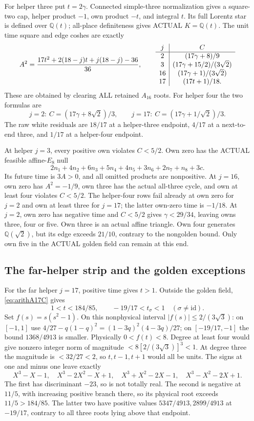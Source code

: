 For helper three put \(t=2\gamma\).
Connected simple-three normalization gives a square-two cap,
helper product \(-1\), own product \(-t\), and integral \(t\).
Its full Lorentz star is defined over \(\mathbb Q(t)\);
all-place definiteness gives ACTUAL \(K=\mathbb Q(t)\).
The unit time square and edge coshes are exactly
\[
 A^2={17t^2+2(18-j)t+j(18-j)-36\over36},
\qquad
\begin{array}{c|c}
j&C\\ \hline
2&(17\gamma+8)/9\\
3&(17\gamma+15/2)/(3\sqrt2)\\
16&(17\gamma+1)/(3\sqrt2)\\
17&(17t+1)/18 .
\end{array}
\]
These are obtained by clearing ALL retained \(A_{16}\) roots.
For helper four the two formulas are
\[
 j=2:\ C=(17\gamma+8\sqrt2)/3,\qquad
 j=17:\ C=(17\gamma+1/\sqrt2)/3 .
\]
The raw white residuals are \(18/17\) at a helper-three
endpoint, \(4/17\) at a next-to-end three, and \(1/17\)
at a helper-four endpoint.

At helper \(j=3\), every positive own violates \(C<5/2\).
Own zero has the ACTUAL feasible affine-\(E_8\) null
\[
 2n_1+4n_2+6n_3+5n_4+4n_5+3n_6+2n_7+n_8+3c .
\]
Its future time is \(3A>0\), and all omitted products are
nonpositive.
At \(j=16\), own zero has \(A^2=-1/9\), own three has
the actual all-three cycle, and own at least four violates
\(C<5/2\).
The helper-four rows fail already at own zero for \(j=2\)
and own at least three for \(j=17\); the latter own-zero
time is \(-1/18\).
At \(j=2\), own zero has negative time and
\(C<5/2\) gives \(\gamma<29/34\), leaving owns three,
four or five.
Own three is an actual affine triangle.
Own four generates \(\mathbb Q(\sqrt2)\), but its edge exceeds
\(21/10\), contrary to the nongolden bound.
Only own five in the ACTUAL golden field can remain at this end.

\subsection{The far-helper strip and the golden exceptions}
\label{app:arithA17goldenends}

For the far helper \(j=17\), positive time gives \(t>1\).
Outside the golden field, \eqref{eq:arithA17C} gives
\[
 1<t<184/85,\qquad -19/17<t_\sigma<1\quad(\sigma\ne\mathrm{id}).
\]
Set \(f(s)=s(s^2-1)\).
On this nonphysical interval
\(\lvert f(s)\rvert\le2/(3\sqrt3)\):
on \([-1,1]\) use
\(4/27-q(1-q)^2=(1-3q)^2(4-3q)/27\);
on \([-19/17,-1]\) the bound \(1368/4913\) is smaller.
Physically \(0<f(t)<8\).
Degree at least four would give nonzero integer norm of
magnitude \(<8[2/(3\sqrt3)]^3<1\).
At degree three the magnitude is \(<32/27<2\), so
\(t,t-1,t+1\) would all be units.
The signs at one and minus one leave exactly
\[
 X^3-X-1,\quad X^3-2X^2-X+1,\quad
 X^3+X^2-2X-1,\quad X^3-X^2-2X+1 .
\]
The first has discriminant \(-23\), so is not totally real.
The second is negative at \(11/5\), with increasing positive
branch there, so its physical root exceeds \(11/5>184/85\).
The latter two have positive values \(5347/4913,2899/4913\)
at \(-19/17\), contrary to all three roots lying above that
endpoint.

